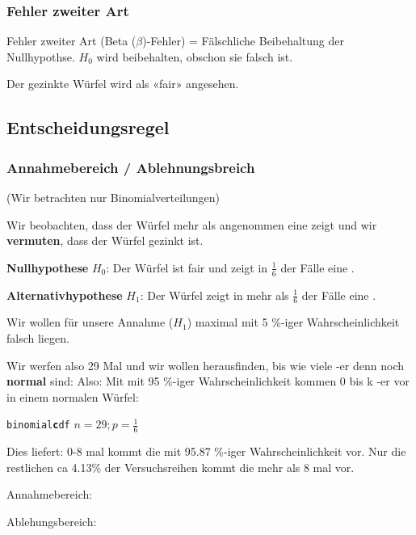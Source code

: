 \subsubsection{Fehler zweiter Art}
Fehler zweiter Art (Beta ($\beta$)-Fehler) = Fälschliche Beibehaltung
der Nullhypothse. $H_0$ wird beibehalten, obschon sie falsch ist. 

Der gezinkte Würfel wird als «fair» angesehen.

\TNTeop{}
\newpage


\subsection{Entscheidungsregel}
\subsubsection*{Annahmebereich / Ablehnungsbreich}
(Wir betrachten nur Binomialverteilungen)

Wir beobachten, dass der Würfel mehr als angenommen eine 
zeigt und wir \textbf{vermuten}, dass der Würfel gezinkt ist.

\textbf{Nullhypothese} $H_0$: Der Würfel ist fair und zeigt in
$\frac16$ der Fälle eine .

\textbf{Alternativhypothese} $H_1$: Der Würfel zeigt in mehr als
$\frac{1}{6}$ der Fälle eine .

Wir wollen für unsere Annahme ($H_1$) maximal mit 5 \%-iger
Wahrscheinlichkeit falsch liegen.

Wir werfen also 29 Mal und wir wollen herausfinden, bis wie viele
-er denn noch \textbf{normal} sind:
Also: Mit mit 95 \%-iger Wahrscheinlichkeit kommen 0 bis k
-er vor in einem normalen Würfel:

\texttt{binomial\textbf{c}df} $n=29; p=\frac16$

Dies liefert: 0-8 mal kommt die  mit 95.87 \%-iger
Wahrscheinlichkeit vor. Nur die restlichen ca 4.13\% der
Versuchsreihen kommt die  mehr als 8 mal vor.


Annahmebereich:


Ablehungsbereich:


\newpage


